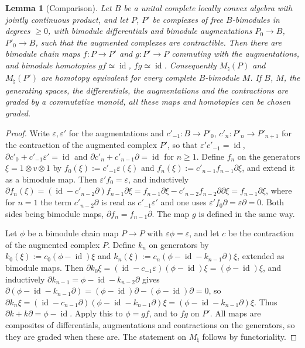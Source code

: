 \documentclass[11pt]{amsart}
\newtheorem{lemma}[theorem]{Lemma}
\theoremstyle{definition}
\theoremstyle{remark}
\newcommand{\id}{\operatorname{id}}
\begin{document}
\begin{lemma}[Comparison]\label{lem:compare}
Let $B$ be a unital complete locally convex algebra with jointly continuous
product, and let $P$, $P'$ be complexes of free $B$-bimodules in degrees
$\ge0$, with bimodule differentials and bimodule augmentations $P_0\to B$,
$P'_0\to B$, such that the augmented complexes are contractible.  Then there
are bimodule chain maps $f:P\to P'$ and $g:P'\to P$ commuting with the
augmentations, and bimodule homotopies $gf\simeq\id$, $fg\simeq\id$.
Consequently $M_{\natural}(P)$ and $M_{\natural}(P')$ are homotopy equivalent
for every complete $B$-bimodule $M$.  If $B$, $M$, the generating spaces, the
differentials, the augmentations and the contractions are graded by a
commutative monoid, all these maps and homotopies can be chosen graded.
\end{lemma}

\begin{proof}
Write $\varepsilon,\varepsilon'$ for the augmentations and
$c'_{-1}:B\to P'_0$, $c'_n:P'_n\to P'_{n+1}$ for the contraction of the
augmented complex $P'$, so that $\varepsilon'c'_{-1}=\id$,
$\partial c'_0+c'_{-1}\varepsilon'=\id$ and $\partial c'_n+c'_{n-1}\partial=\id$
for $n\ge1$.  Define $f_n$ on the generators $\xi=1\otimes v\otimes1$ by
$f_0(\xi):=c'_{-1}\varepsilon(\xi)$ and $f_n(\xi):=c'_{n-1}f_{n-1}\partial\xi$,
and extend it as a bimodule map.  Then $\varepsilon'f_0=\varepsilon$, and
inductively
$\partial f_n(\xi)=(\id-c'_{n-2}\partial)f_{n-1}\partial\xi
=f_{n-1}\partial\xi-c'_{n-2}f_{n-2}\partial\partial\xi=f_{n-1}\partial\xi$,
where for $n=1$ the term $c'_{n-2}\partial$ is read as $c'_{-1}\varepsilon'$ and
one uses $\varepsilon'f_0\partial=\varepsilon\partial=0$.  Both sides being
bimodule maps, $\partial f_n=f_{n-1}\partial$.  The map $g$ is defined in the
same way.

Let $\phi$ be a bimodule chain map $P\to P$ with $\varepsilon\phi=\varepsilon$,
and let $c$ be the contraction of the augmented complex $P$.  Define $k_n$ on
generators by $k_0(\xi):=c_0(\phi-\id)\xi$ and
$k_n(\xi):=c_n(\phi-\id-k_{n-1}\partial)\xi$, extended as bimodule maps.  Then
$\partial k_0\xi=(\id-c_{-1}\varepsilon)(\phi-\id)\xi=(\phi-\id)\xi$, and
inductively $\partial k_{n-1}=\phi-\id-k_{n-2}\partial$ gives
$\partial(\phi-\id-k_{n-1}\partial)=(\phi-\id)\partial-(\phi-\id)\partial=0$, so
$\partial k_n\xi=(\id-c_{n-1}\partial)(\phi-\id-k_{n-1}\partial)\xi
=(\phi-\id-k_{n-1}\partial)\xi$.  Thus $\partial k+k\partial=\phi-\id$.  Apply
this to $\phi=gf$, and to $fg$ on $P'$.  All maps are composites of
differentials, augmentations and contractions on the generators, so they are
graded when these are.  The statement on $M_{\natural}$ follows by
functoriality.
\end{proof}
\end{document}

